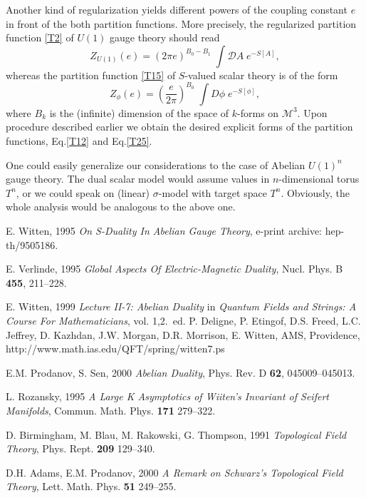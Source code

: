 \documentclass[a4paper,12pt]{article}
\begin{document}
Another kind of regularization yields different powers of the
coupling constant $e$ in front of the both partition functions.
More precisely, the regularized partition function \eqref{T2} of $U(1)$ gauge theory should read
\begin{equation}\label{T31}
Z_{U(1)}(e) = (2 \pi e)^{B_{0}-B_{1}}\; \int\mathcal{D}A\; e^{- S[A]},
\end{equation}
whereas the partition function \eqref{T15} of $S$-valued scalar theory is of the form
\begin{equation}\label{T32}
Z_{\phi} (e) =\left(\frac{e}{2 \pi}\right)^{B_{0}}\; \int D\phi \; e^{-S[\phi]},
\end{equation}
where $B_{k}$ is the (infinite) dimension of the space of $k$-forms on $\mathcal{M}^{3}$.
Upon procedure described earlier we obtain the desired explicit forms of the partition functions, Eq.\eqref{T12} and
Eq.\eqref{T25}.

One could easily generalize our considerations to the case of
Abelian $U(1)^{n}$ gauge theory. The dual scalar model would
assume values in $n$-dimensional torus $T^{n}$, or we could speak
on (linear) $\sigma$-model with target space $T^{n}$. Obviously,
the whole analysis would be analogous to the above one.
\begin{thebibliography}{99}

\label{B01} E. Witten, 1995  {\it On S-Duality In Abelian Gauge Theory},
e-print archive: hep-th/9505186.

\label{B02} E. Verlinde, 1995  {\it Global Aspects Of Electric-Magnetic Duality},
Nucl. Phys.  B {\bf 455}, 211--228.

\label{B03} E. Witten, 1999 {\it Lecture II-7: Abelian Duality} in {\it Quantum
Fields and Strings: A Course For Mathematicians}, vol. 1,2.\, ed.
P. Deligne, P. Etingof, D.S. Freed, L.C. Jeffrey, D. Kazhdan, J.W. Morgan, D.R. Morrison, E. Witten, AMS, Providence,
http://www.math.ias.edu/QFT/spring/witten7.ps

\label{B04} E.M. Prodanov, S. Sen, 2000
{\it Abelian Duality}, Phys. Rev. D {\bf 62}, 045009--045013.

\label{B05} L. Rozansky, 1995 {\it A Large K
Asymptotics of Wiiten's Invariant of Seifert Manifolds}, Commun.
Math. Phys. {\bf 171} 279--322.

\label{B06}
D. Birmingham, M. Blau, M. Rakowski, G. Thompson, 1991 {\it
Topological Field Theory}, Phys. Rept. {\bf 209} 129--340.

\label{B07} D.H. Adams, E.M. Prodanov, 2000 {\it A Remark
on Schwarz's Topological Field Theory}, Lett. Math. Phys. {\bf 51}
249--255.

\end{thebibliography}
\end{document}
